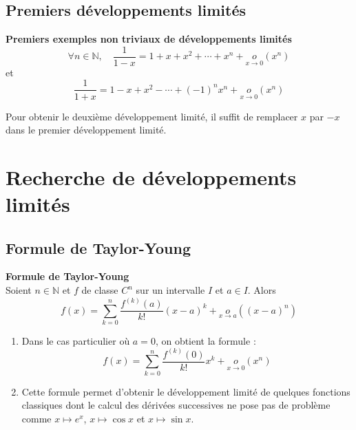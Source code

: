 \subsection{Premiers développements limités}
\begin{Ex} \textbf{Premiers exemples non triviaux de développements limités}\\
\[
\forall n \in \mathbb{N}, \quad \frac{1}{1 - x} = 1 + x + x^2 + \cdots + x^n + \underset{x \to 0}{o}(x^n)
\]
et
\[
\frac{1}{1 + x} = 1 - x + x^2 - \cdots + (-1)^n x^n + \underset{x \to 0}{o}(x^n)
\]
\end{Ex}


\begin{Rem}

Pour obtenir le deuxième développement limité, il suffit de remplacer $x$ par $-x$ dans le premier développement limité.\\

\end{Rem}

\section{Recherche de développements limités}
\subsection{Formule de Taylor-Young}

\begin{Thm}\textbf{Formule de Taylor-Young}\\

Soient \(n \in \mathbb{N}\) et \(f\) de classe \(C^n\) sur un intervalle \(I\) et \(a \in I\). Alors
\[
f(x) = \sum_{k=0}^{n} \frac{f^{(k)}(a)}{k!} (x - a)^k + \underset{x \to a}{o} \left( (x - a)^n \right)
\]


\end{Thm}


\begin{Rem}
\begin{enumerate}
    \item Dans le cas particulier où \(a = 0\), on obtient la formule :
    \[
    f(x) = \sum_{k=0}^{n} \frac{f^{(k)}(0)}{k!} x^k + \underset{x \to 0}{o} \left( x^n \right)
    \]
    \item Cette formule permet d’obtenir le développement limité de quelques fonctions classiques dont le calcul des dérivées successives ne pose pas de problème comme \(x \mapsto e^x\), \(x \mapsto \cos x\) et \(x \mapsto \sin x\).\\
\end{enumerate}
\end{Rem}


